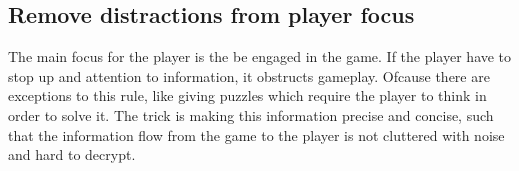 \subsection{Remove distractions from player focus}
The main focus for the player is the be engaged in the game. If the player have to stop up and attention to information, it obstructs gameplay. Ofcause there are exceptions to this rule, like giving puzzles which require the player to think in order to solve it. The trick is making this information precise and concise, such that the information flow from the game to the player is not cluttered with noise and hard to decrypt.

